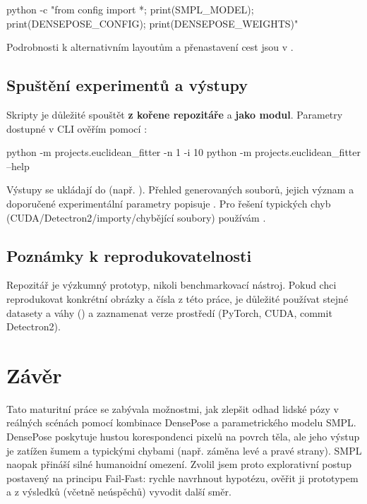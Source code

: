 \documentclass[11pt,a4paper,twoside,openright]{report}
\begin{document}
\begin{codeblock}
python -c "from config import *; print(SMPL_MODEL); print(DENSEPOSE_CONFIG); print(DENSEPOSE_WEIGHTS)"
\end{codeblock}

Podrobnosti k alternativním layoutům a přenastavení cest jsou v .

\section{Spuštění experimentů a výstupy}

Skripty je důležité spouštět \textbf{z kořene repozitáře} a \textbf{jako modul}. Parametry dostupné v CLI ověřím pomocí :

\begin{codeblock}
python -m projects.euclidean_fitter -n 1 -i 10
python -m projects.euclidean_fitter --help
\end{codeblock}

Výstupy se ukládají do  (např. ). Přehled generovaných souborů, jejich význam a doporučené experimentální parametry popisuje . Pro řešení typických chyb (CUDA/Detectron2/importy/chybějící soubory) používám .

\section{Poznámky k reprodukovatelnosti}

Repozitář je výzkumný prototyp, nikoli benchmarkovací nástroj. Pokud chci reprodukovat konkrétní obrázky a čísla z této práce, je důležité používat stejné datasety a váhy () a zaznamenat verze prostředí (PyTorch, CUDA, commit Detectron2).

\chapter{Závěr}

Tato maturitní práce se zabývala možnostmi, jak zlepšit odhad lidské pózy v reálných scénách pomocí kombinace DensePose a parametrického modelu SMPL. DensePose poskytuje hustou korespondenci pixelů na povrch těla, ale jeho výstup je zatížen šumem a typickými chybami (např. záměna levé a pravé strany). SMPL naopak přináší silné humanoidní omezení. Zvolil jsem proto explorativní postup postavený na principu Fail-Fast: rychle navrhnout hypotézu, ověřit ji prototypem a z výsledků (včetně neúspěchů) vyvodit další směr.
\end{document}
